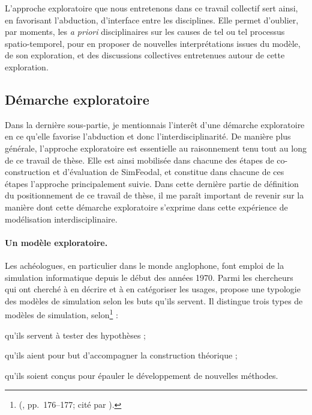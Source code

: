 L'approche exploratoire que nous entretenons dans ce travail collectif sert ainsi, en favorisant l'abduction, d'interface entre les disciplines.
Elle permet d'oublier, par moments, les \textit{a priori} disciplinaires sur les causes de tel ou tel processus spatio-temporel, pour en proposer de nouvelles interprétations issues du modèle, de son exploration, et des discussions collectives entretenues autour de cette exploration.

\subsection{Démarche exploratoire}

Dans la dernière sous-partie, je mentionnais l'interêt d'une démarche exploratoire en ce qu'elle favorise l'abduction et donc l'interdisciplinarité.
De manière plus générale, l'approche exploratoire est essentielle au raisonnement tenu tout au long de ce travail de thèse.
Elle est ainsi mobilisée dans chacune des étapes de co-construction et d'évaluation de SimFeodal, et constitue dans chacune de ces étapes l'approche principalement suivie.
Dans cette dernière partie de définition du positionnement de ce travail de thèse, il me paraît important de revenir sur la manière dont cette démarche exploratoire s'exprime dans cette expérience de modélisation interdisciplinaire.

\paragraph{Un modèle exploratoire.}

Les achéologues, en particulier dans le monde anglophone, font emploi de la simulation informatique depuis le début des années 1970.
Parmi les chercheurs qui ont cherché à en décrire et à en catégoriser les usages, \citeauthor{mithen2018simulating} propose une typologie des modèles de simulation selon les buts qu'ils servent.
Il distingue trois types de modèles de simulation, selon\footnote{
	\citeauthor{mithen2018simulating} \mkbibparens{\cite*{mithen2018simulating}, pp.~176--177; cité par \cite[260]{lake_trends_2014}}.
} :
\begin{compactenum}\vspace*{-0.5em}
	\item qu'ils servent à tester des hypothèses ;
	\item qu'ils aient pour but d'accompagner la construction théorique ;
	\item qu'ils soient conçus pour épauler le développement de nouvelles méthodes.
\end{compactenum}\vspace*{-0.5em}	

